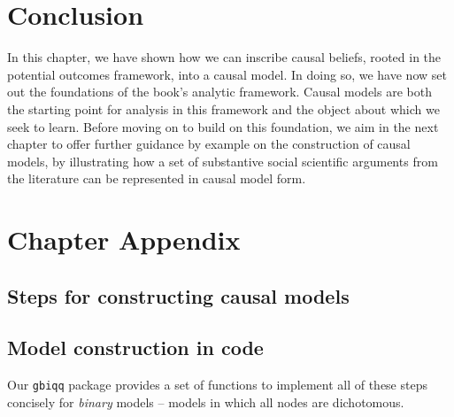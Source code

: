 \documentclass[
  12pt,
]{book}
\begin{document}
\hypertarget{conc2}{%
\section{Conclusion}\label{conc2}}

In this chapter, we have shown how we can inscribe causal beliefs, rooted in the potential outcomes framework, into a causal model. In doing so, we have now set out the foundations of the book's analytic framework. Causal models are both the starting point for analysis in this framework and the object about which we seek to learn. Before moving on to build on this foundation, we aim in the next chapter to offer further guidance by example on the construction of causal models, by illustrating how a set of substantive social scientific arguments from the literature can be represented in causal model form.

\newpage

\hypertarget{chapter-appendix}{%
\section{Chapter Appendix}\label{chapter-appendix}}

\hypertarget{steps-for-constructing-causal-models}{%
\subsection{Steps for constructing causal models}\label{steps-for-constructing-causal-models}}

\hypertarget{model-construction-in-code}{%
\subsection{Model construction in code}\label{model-construction-in-code}}

Our \texttt{gbiqq} package provides a set of functions to implement all of these steps concisely for \emph{binary} models -- models in which all nodes are dichotomous.
\end{document}
